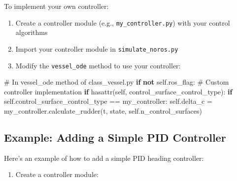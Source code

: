 \documentclass[
  letterpaper,
  DIV=11,
  numbers=noendperiod]{scrreprt}
\newenvironment{Shaded}{\begin{snugshade}}{\end{snugshade}}
\newcommand{\BuiltInTok}[1]{\textcolor[rgb]{0.00,0.23,0.31}{#1}}
\newcommand{\CommentTok}[1]{\textcolor[rgb]{0.37,0.37,0.37}{#1}}
\newcommand{\ControlFlowTok}[1]{\textcolor[rgb]{0.00,0.23,0.31}{\textbf{#1}}}
\newcommand{\KeywordTok}[1]{\textcolor[rgb]{0.00,0.23,0.31}{\textbf{#1}}}
\newcommand{\NormalTok}[1]{\textcolor[rgb]{0.00,0.23,0.31}{#1}}
\newcommand{\OperatorTok}[1]{\textcolor[rgb]{0.37,0.37,0.37}{#1}}
\newcommand{\StringTok}[1]{\textcolor[rgb]{0.13,0.47,0.30}{#1}}
\newcommand{\VariableTok}[1]{\textcolor[rgb]{0.07,0.07,0.07}{#1}}
\providecommand{\tightlist}{%
  \setlength{\itemsep}{0pt}\setlength{\parskip}{0pt}}\usepackage{longtable,booktabs,array}
\begin{document}
To implement your own controller:

\begin{enumerate}
\def\labelenumi{\arabic{enumi}.}
\tightlist
\item
  Create a controller module (e.g., \texttt{my\_controller.py}) with
  your control algorithms
\item
  Import your controller module in \texttt{simulate\_noros.py}
\item
  Modify the \texttt{vessel\_ode} method to use your controller:
\end{enumerate}

\begin{Shaded}
\begin{Highlighting}[]
\CommentTok{\# In vessel\_ode method of class\_vessel.py}
\ControlFlowTok{if} \KeywordTok{not} \VariableTok{self}\NormalTok{.ros\_flag:}
    \CommentTok{\# Custom controller implementation}
    \ControlFlowTok{if} \BuiltInTok{hasattr}\NormalTok{(}\VariableTok{self}\NormalTok{, }\StringTok{\textquotesingle{}control\_surface\_control\_type\textquotesingle{}}\NormalTok{):}
        \ControlFlowTok{if} \VariableTok{self}\NormalTok{.control\_surface\_control\_type }\OperatorTok{==} \StringTok{\textquotesingle{}my\_controller\textquotesingle{}}\NormalTok{:}
            \VariableTok{self}\NormalTok{.delta\_c }\OperatorTok{=}\NormalTok{ my\_controller.calculate\_rudder(t, state, }\VariableTok{self}\NormalTok{.n\_control\_surfaces)}
\end{Highlighting}
\end{Shaded}

\subsection*{Example: Adding a Simple PID
Controller}\label{example-adding-a-simple-pid-controller}

Here's an example of how to add a simple PID heading controller:

\begin{enumerate}
\def\labelenumi{\arabic{enumi}.}
\tightlist
\item
  Create a controller module:
\end{enumerate}
\end{document}
